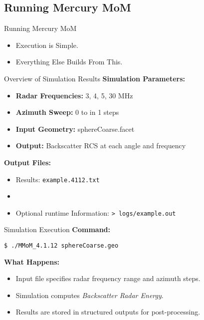 % 

\subsection{Running Mercury MoM}

\begin{frame}{Running Mercury MoM}
\begin{center}
    \texttt{}
\end{center}
\vspace{0.5cm}
\begin{itemize}
    \item Execution is Simple.  
    \item Everything Else Builds From This.
\end{itemize}
\end{frame}

\begin{frame}{Overview of Simulation Results}
\textbf{Simulation Parameters:}
\begin{itemize}
    \item \textbf{Radar Frequencies:} 3, 4, 5, 30 MHz
    \item \textbf{Azimuth Sweep:} 0\textdegree{} to \textdegree{} in 1\textdegree{} steps
    \item \textbf{Input Geometry:} sphereCoarse.facet
    \item \textbf{Output:} Backscatter RCS at each angle and frequency
\end{itemize}
\vspace{0.3cm}
\textbf{Output Files:}
\begin{itemize}
    \item Results: \texttt{example.4112.txt}
    \item {}
    \item Optional runtime Information: \texttt{> logs/example.out}
\end{itemize}
\end{frame}

\begin{frame}{Simulation Execution}
\textbf{Command:}
\begin{center}
\texttt{\$ ./MMoM\_4.1.12 sphereCoarse.geo}
\end{center}
\textbf{What Happens:}
\begin{itemize}
    \item Input file specifies radar frequency range and azimuth steps.
    \item Simulation computes \textit{Backscatter Radar Energy}.
    \item Results are stored in structured outputs for post-processing.
\end{itemize}
\end{frame}


